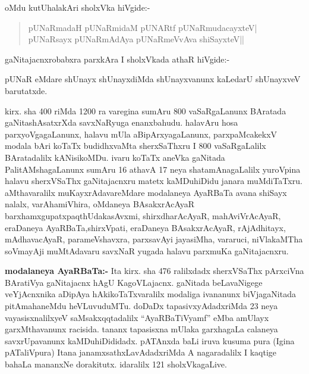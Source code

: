 oMdu kutUhalakAri sholxVka hiVgide:-
\begin{verse}
pUNaRmadaH pUNaRmidaM pUNARtf pUNaRmudacayxteV|\\
pUNaRsayx pUNaRmAdAya pUNaRmeVvAva shiSayxteV||
\end{verse}

gaNitajacnxrobabxra parxkAra I sholxVkada athaR hiVgide:-

pUNaR eMdare shUnayx shUnayxdiMda shUnayxvanunx kaLedarU shUnayxveV barutatxde.

kirx. sha {\rm 400} riMda {\rm 1200} ra varegina sumAru {\rm 800} vaSaRgaLanunx BAratada gaNita\-shAsatxrXda savxNaRyuga enanxbahudu. halavAru hosa parxyoVgagaLanunx, halavu mUla aBipArxyagaLanunx, parxpaMcakekxV modala bAri koTaTx budidhxvaMta sherxSaThxru I {\rm 800} vaSaRgaLalilx BAratadalilx kANisikoMDu. ivaru koTaTx aneVka gaNitada PalitAMshagaLanunx sumAru {\rm 16} athavA {\rm 17} neya shatamAnagaLalilx yuroVpina halavu sherxVSaThx gaNita\-jacnxru matetx kaMDuhiDidu janara muMdiTaTxru. aMthavaralilx muKayxrAdavareMdare modalaneya AyaRBaTa avana shiSayx nalalx, varAhamiVhira, oMdaneya BAsakxrAcAyaR barxhamxgupatx\break paqthUdakasAvxmi, shirxdharAcAyaR, mahAviVrAcAyaR, eraDaneya AyaRBaTa,\break shirxVpati, eraDaneya BAsakxrAcAyaR, rAjAdhitayx, mAdhavacAyaR, parameVshavxra, parxsa\-vAyi jayasiMha, vararuci, niVlakaMTha soVmayAji muMtAdavaru savxNaR yugada halavu parxmuKa gaNitajacnxru.

\textbf{modalaneya AyaRBaTa:-} Ita kirx. sha {\rm 476} ralilxdadx sherxVSaThx pArxciVna BAratiVya gaNitajacnx hAgU KagoVLajacnx. gaNitada beLavaNigege veYjAcnxnika aDipAya hAkikoTaTxvaralilx modaliga ivananunx biVjagaNitada pitAmahaneMdu heVLuvuduMTu. doDaDx tapasivxyAdadxriMda {\rm 23} neya vayasisxnalilxyeV saMsakxqqtadalilx ``AyaRBaTiVyamf'' eMba amUlayx garxMthavanunx racisida. tananx tapasisxna mUlaka garxhagaLa calaneya savxrUpavanunx kaMDuhiDididadx. pATAnxda baLi iruva kusuma pura (Igina pATaliVpura) Itana janamxsathxLavAdadxriMda  A nagaradalilx I kaqtige bahaLa mananxNe dorakitutx. idaralilx {\rm 121} sholxVkagaLive.


